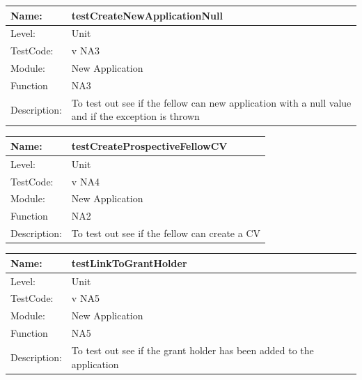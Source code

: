 \documentclass[12pt]{article}
\begin{document}
\begin{center}
\begin{tabular}{|l|p{12cm}|}
\hline
 Name: & testCreateNewApplicationNull  \\
\hline
Level: & Unit \\
\hline
TestCode: & v NA3 \\
\hline
Module:& New Application\\
\hline
Function & NA3 \\
\hline
Description: & To test out see if the fellow can  new application with a null value and if the exception is thrown  \\
\hline

\end{tabular}
\end{center}

\begin{center}
\begin{tabular}{|l|p{12cm}|}
\hline

 Name: & testCreateProspectiveFellowCV  \\
\hline
Level: & Unit \\
\hline
TestCode: & v NA4 \\
\hline
Module:& New Application\\
\hline
Function & NA2 \\
\hline
Description: & To test out see if the fellow can  create a CV  \\
\hline

\end{tabular}
\end{center}

\begin{center}
\begin{tabular}{|l|p{12cm}|}
\hline

 Name: & testLinkToGrantHolder  \\
\hline
Level: & Unit \\
\hline
TestCode: & v NA5 \\
\hline
Module:& New Application\\
\hline
Function & NA5 \\
\hline
Description: & To test out see if the grant holder has been added to the application  \\
\hline

\end{tabular}
\end{center}
\end{document}
